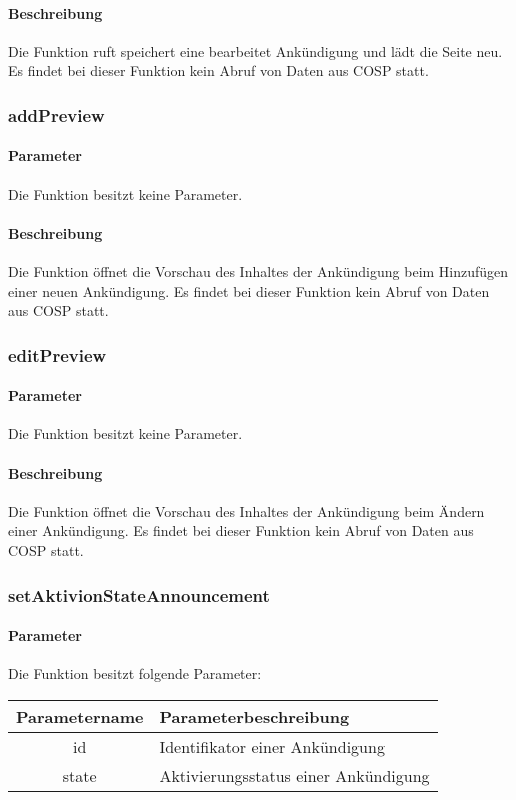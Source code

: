 \paragraph{Beschreibung} Die Funktion ruft speichert eine bearbeitet Ankündigung und lädt die Seite neu. Es findet bei dieser Funktion kein Abruf von Daten aus {\glqq COSP\grqq} statt.
\subsubsection{addPreview}
\paragraph{Parameter} Die Funktion besitzt keine Parameter.
\paragraph{Beschreibung} Die Funktion öffnet die Vorschau des Inhaltes der Ankündigung beim Hinzufügen einer neuen Ankündigung. Es findet bei dieser Funktion kein Abruf von Daten aus {\glqq COSP\grqq} statt.
\subsubsection{editPreview}
\paragraph{Parameter} Die Funktion besitzt keine Parameter.
\paragraph{Beschreibung} Die Funktion öffnet die Vorschau des Inhaltes der Ankündigung beim Ändern einer Ankündigung. Es findet bei dieser Funktion kein Abruf von Daten aus {\glqq COSP\grqq} statt.
\subsubsection{setAktivionStateAnnouncement}
\paragraph{Parameter} Die Funktion besitzt folgende Parameter:
\begin{table}[H]
	\begin{tabular}{|c|p{11cm}|}
		\hline
		\textbf{Parametername} & \textbf{Parameterbeschreibung} \\ \hline
		id    & Identifikator einer Ankündigung \\ \hline
		state & Aktivierungsstatus einer Ankündigung \\ \hline
	\end{tabular}
\end{table}
